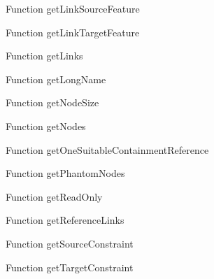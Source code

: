 \begin{minipage}[b]{0.5\textwidth}
\centering
{}
Function getLinkSourceFeature
\end{minipage}
\begin{minipage}[b]{0.5\textwidth}
\centering
{}
Function getLinkTargetFeature
\end{minipage}
\begin{minipage}[b]{0.5\textwidth}
\centering
{}
Function getLinks
\end{minipage}
\begin{minipage}[b]{0.5\textwidth}
\centering
{}
Function getLongName
\end{minipage}
\begin{minipage}[b]{0.5\textwidth}
\centering
{}
Function getNodeSize
\end{minipage}
\begin{minipage}[b]{0.5\textwidth}
\centering
{}
Function getNodes
\end{minipage}
\begin{minipage}[b]{0.5\textwidth}
\centering
{}
Function getOneSuitableContainmentReference
\end{minipage}
\begin{minipage}[b]{0.5\textwidth}
\centering
{}
Function getPhantomNodes
\end{minipage}
\begin{minipage}[b]{0.5\textwidth}
\centering
{}
Function getReadOnly
\end{minipage}
\begin{minipage}[b]{0.5\textwidth}
\centering
{}
Function getReferenceLinks
\end{minipage}
\begin{minipage}[b]{0.5\textwidth}
\centering
{}
Function getSourceConstraint
\end{minipage}
\begin{minipage}[b]{0.5\textwidth}
\centering
{}
Function getTargetConstraint
\end{minipage}
